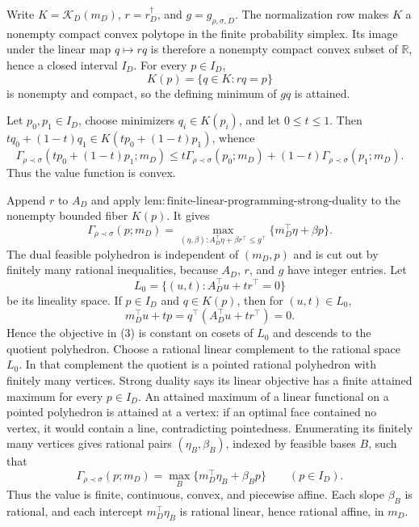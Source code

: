 Write \(K=\mathcal K_D(m_D)\), \(r=r_D^\dagger\), and \(g=g_{\rho,\sigma,D}\).  The normalization row makes \(K\) a nonempty compact convex polytope in the finite probability simplex.  Its image under the linear map \(q\mapsto rq\) is therefore a nonempty compact convex subset of \(\mathbb R\), hence a closed interval \(I_D\).  For every \(p\in I_D\),
\[
K(p)=\{q\in K:rq=p\}
\]
is nonempty and compact, so the defining minimum of \(gq\) is attained.

Let \(p_0,p_1\in I_D\), choose minimizers \(q_i\in K(p_i)\), and let \(0\leq t\leq1\).  Then \(tq_0+(1-t)q_1\in K(tp_0+(1-t)p_1)\), whence
\[
\Gamma_{\rho\prec\sigma}(tp_0+(1-t)p_1;m_D)
\leq t\Gamma_{\rho\prec\sigma}(p_0;m_D)
+(1-t)\Gamma_{\rho\prec\sigma}(p_1;m_D).
\]
Thus the value function is convex.

Append \(r\) to \(A_D\) and apply \(\mathrm{lem:finite\text{-}linear\text{-}programming\text{-}strong\text{-}duality}\) to the nonempty bounded fiber \(K(p)\).  It gives
\[
\Gamma_{\rho\prec\sigma}(p;m_D)
=\max_{(\eta,\beta):A_D^\top\eta+\beta r^\top\leq g^\top}
\{m_D^\top\eta+\beta p\}.
\tag{3}
\]
The dual feasible polyhedron is independent of \((m_D,p)\) and is cut out by finitely many rational inequalities, because \(A_D\), \(r\), and \(g\) have integer entries.  Let
\[
L_0=\{(u,t):A_D^\top u+t r^\top=0\}
\]
be its lineality space.  If \(p\in I_D\) and \(q\in K(p)\), then for \((u,t)\in L_0\),
\[
m_D^\top u+tp
=q^\top(A_D^\top u+t r^\top)=0.
\]
Hence the objective in (3) is constant on cosets of \(L_0\) and descends to the quotient polyhedron.  Choose a rational linear complement to the rational space \(L_0\).  In that complement the quotient is a pointed rational polyhedron with finitely many vertices.  Strong duality says its linear objective has a finite attained maximum for every \(p\in I_D\).  An attained maximum of a linear functional on a pointed polyhedron is attained at a vertex: if an optimal face contained no vertex, it would contain a line, contradicting pointedness.  Enumerating its finitely many vertices gives rational pairs \((\eta_B,\beta_B)\), indexed by feasible bases \(B\), such that
\[
\Gamma_{\rho\prec\sigma}(p;m_D)
=\max_B\{m_D^\top\eta_B+\beta_Bp\}
\qquad(p\in I_D).
\tag{4}
\]
Thus the value is finite, continuous, convex, and piecewise affine.  Each slope \(\beta_B\) is rational, and each intercept \(m_D^\top\eta_B\) is rational linear, hence rational affine, in \(m_D\).

